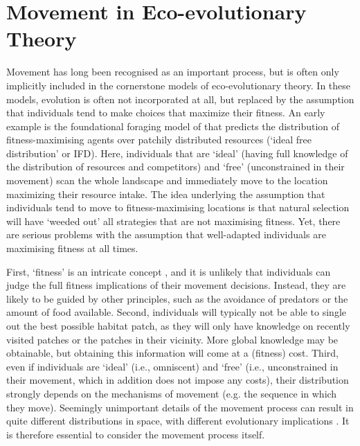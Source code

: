 \section*{Movement in Eco-evolutionary Theory}

Movement has long been recognised as an important process, but is often only implicitly included in the cornerstone models of eco-evolutionary theory.
In these models, evolution is often not incorporated at all, but replaced by the assumption that individuals tend to make choices that maximize their fitness. 
An early example is the foundational foraging model of \textcite{fretwell1970} that predicts the distribution of fitness-maximising agents over patchily distributed resources (`ideal free distribution' or IFD). Here, individuals that are `ideal' (having full knowledge of the distribution of resources and competitors) and `free' (unconstrained in their movement) scan the whole landscape and immediately move to the location maximizing their resource intake. 
The idea underlying the assumption that individuals tend to move to fitness-maximising locations is that natural selection will have `weeded out' all strategies that are not maximising fitness.
Yet, there are serious problems with the assumption that well-adapted individuals are maximising fitness at all times.

First, `fitness' is an intricate concept \parencite{brommer2000}, and it is unlikely that individuals can judge the full fitness implications of their movement decisions. 
Instead, they are likely to be guided by other principles, such as the avoidance of predators or the amount of food available. 
Second, individuals will typically not be able to single out the best possible habitat patch, as they will only have knowledge on recently visited patches or the patches in their vicinity. 
More global knowledge may be obtainable, but obtaining this information will come at a (fitness) cost. 
Third, even if individuals are `ideal' (i.e., omniscent) and `free' (i.e., unconstrained in their movement, which in addition does not impose any costs), their distribution strongly depends on the mechanisms of movement (e.g. the sequence in which they move). 
Seemingly unimportant details of the movement process can result in quite different distributions in space, with different evolutionary implications \parencite{houston1998a}. 
It is therefore essential to consider the movement process itself.

